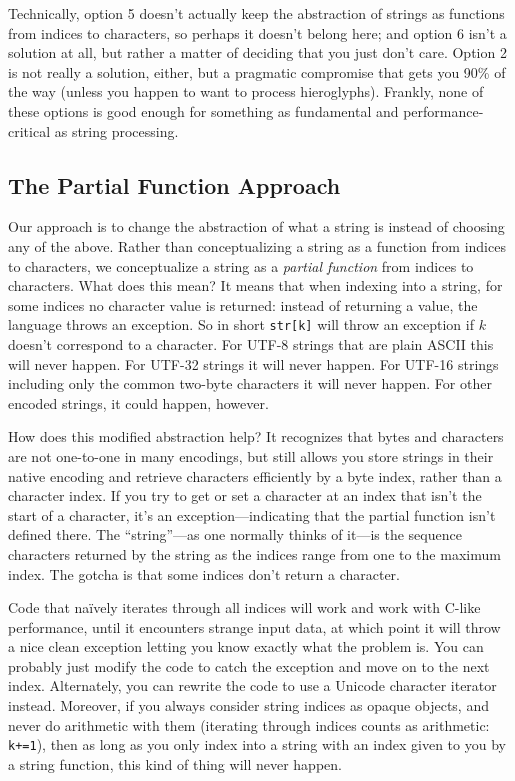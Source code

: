 \documentclass{article}
\begin{document}
Technically, option 5 doesn't actually keep the abstraction of strings as functions from indices to characters, so perhaps it doesn't belong here;
and option 6 isn't a solution at all, but rather a matter of deciding that you just don't care.
Option 2 is not really a solution, either, but a pragmatic compromise that gets you 90\% of the way (unless you happen to want to process hieroglyphs).
Frankly, none of these options is good enough for something as fundamental and performance-critical as string processing.

\subsection{The Partial Function Approach}

Our approach is to change the abstraction of what a string is instead of choosing any of the above.
Rather than conceptualizing a string as a function from indices to characters, we conceptualize a string as a \emph{partial function} from indices to characters.
What does this mean?
It means that when indexing into a string, for some indices no character value is returned:
instead of returning a value, the language throws an exception.
So in short \verb|str[k]| will throw an exception if $k$ doesn't correspond to a character.
For UTF-8 strings that are plain ASCII this will never happen.
For UTF-32 strings it will never happen.
For UTF-16 strings including only the common two-byte characters it will never happen.
For other encoded strings, it could happen, however.

How does this modified abstraction help?
It recognizes that bytes and characters are not one-to-one in many encodings, but still allows you store strings in their native encoding and retrieve characters efficiently by a byte index, rather than a character index.
If you try to get or set a character at an index that isn't the start of a character, it's an exception---indicating that the partial function isn't defined there.
The ``string''---as one normally thinks of it---is the sequence characters returned by the string as the indices range from one to the maximum index.
The gotcha is that some indices don't return a character.

Code that na\"ively iterates through all indices will work and work with C-like performance, until it encounters strange input data, at which point it will throw a nice clean exception letting you know exactly what the problem is.
You can probably just modify the code to catch the exception and move on to the next index.
Alternately, you can rewrite the code to use a Unicode character iterator instead.
Moreover, if you always consider string indices as opaque objects, and never do arithmetic with them (iterating through indices counts as arithmetic: \verb|k+=1|), then as long as you only index into a string with an index given to you by a string function, this kind of thing will never happen.
\end{document}
